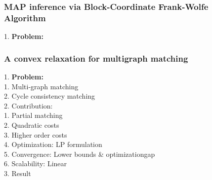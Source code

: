\subsubsection{MAP inference via Block-Coordinate Frank-Wolfe Algorithm}
    1. {\bf Problem:} \\
\subsubsection{A convex relaxation for multigraph matching}
    1. {\bf Problem:} \\
        1. Multi-graph matching \\
        2. Cycle consistency matching \\
    2. Contribution: \\
        1. Partial matching \\
        2. Quadratic costs \\
        3. Higher order costs \\
        4. Optimization: LP formulation \\
        5. Convergence: Lower bounds \& optimizationgap \\
        6. Scalability: Linear \\
    3. Result \\